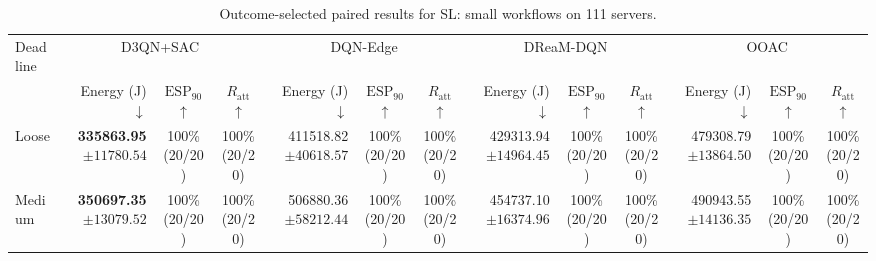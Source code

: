 \documentclass[10pt]{article}
\begin{document}
\begin{table}[!htbp]
\centering
\caption{Outcome-selected paired results for SL: small workflows on 111 servers.}
\label{tab:conditional_case_sl}
\begingroup
\footnotesize
\setlength{\tabcolsep}{2.2pt}
\renewcommand{\arraystretch}{1.08}
\begin{tabular}{@{}l*{4}{rcc}@{}}
\toprule
Deadline & \multicolumn{3}{c}{D3QN+SAC} & \multicolumn{3}{c}{DQN-Edge} & \multicolumn{3}{c}{DReaM-DQN} & \multicolumn{3}{c}{OOAC} \\
\cmidrule(lr){2-4}\cmidrule(lr){5-7}\cmidrule(lr){8-10}\cmidrule(lr){11-13}
 & Energy (J) $\downarrow$ & $\mathrm{ESP}_{90}$ $\uparrow$ & $R_{\mathrm{att}}$ $\uparrow$ & Energy (J) $\downarrow$ & $\mathrm{ESP}_{90}$ $\uparrow$ & $R_{\mathrm{att}}$ $\uparrow$ & Energy (J) $\downarrow$ & $\mathrm{ESP}_{90}$ $\uparrow$ & $R_{\mathrm{att}}$ $\uparrow$ & Energy (J) $\downarrow$ & $\mathrm{ESP}_{90}$ $\uparrow$ & $R_{\mathrm{att}}$ $\uparrow$ \\
\midrule
Loose & \shortstack[r]{\textbf{335863.95}\\$\pm 11780.54$} & \shortstack[c]{100\%\\(20/20)} & \shortstack[c]{100\%\\(20/20)} & \shortstack[r]{411518.82\\$\pm 40618.57$} & \shortstack[c]{100\%\\(20/20)} & \shortstack[c]{100\%\\(20/20)} & \shortstack[r]{429313.94\\$\pm 14964.45$} & \shortstack[c]{100\%\\(20/20)} & \shortstack[c]{100\%\\(20/20)} & \shortstack[r]{479308.79\\$\pm 13864.50$} & \shortstack[c]{100\%\\(20/20)} & \shortstack[c]{100\%\\(20/20)} \\
Medium & \shortstack[r]{\textbf{350697.35}\\$\pm 13079.52$} & \shortstack[c]{100\%\\(20/20)} & \shortstack[c]{100\%\\(20/20)} & \shortstack[r]{506880.36\\$\pm 58212.44$} & \shortstack[c]{100\%\\(20/20)} & \shortstack[c]{100\%\\(20/20)} & \shortstack[r]{454737.10\\$\pm 16374.96$} & \shortstack[c]{100\%\\(20/20)} & \shortstack[c]{100\%\\(20/20)} & \shortstack[r]{490943.55\\$\pm 14136.35$} & \shortstack[c]{100\%\\(20/20)} & \shortstack[c]{100\%\\(20/20)} \\

\end{tabular}
\end{table}
\end{document}
